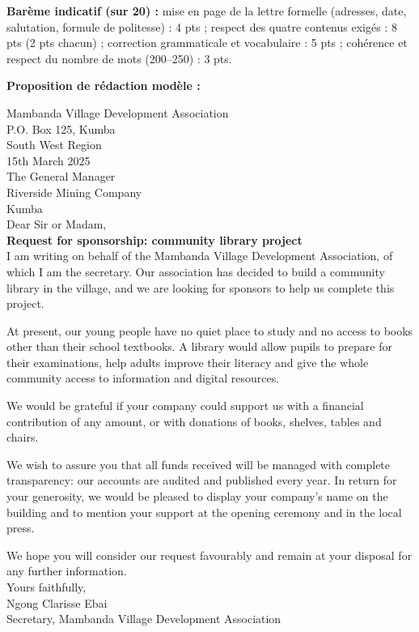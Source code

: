 \documentclass[11pt]{article}
\begin{document}
\begin{corrige}
\textbf{Barème indicatif (sur 20) :} mise en page de la lettre formelle (adresses, date, salutation, formule de politesse) : 4 pts ; respect des quatre contenus exigés : 8 pts (2 pts chacun) ; correction grammaticale et vocabulaire : 5 pts ; cohérence et respect du nombre de mots (200--250) : 3 pts.

\textbf{Proposition de rédaction modèle :}

\begin{textebox}
Mambanda Village Development Association\\
P.O. Box 125, Kumba\\
South West Region\\[0.3em]
15th March 2025\\[0.3em]
The General Manager\\
Riverside Mining Company\\
Kumba\\[0.3em]
Dear Sir or Madam,\\[0.3em]
\textbf{Request for sponsorship: community library project}\\[0.3em]
I am writing on behalf of the Mambanda Village Development Association, of which I am the secretary. Our association has decided to build a community library in the village, and we are looking for sponsors to help us complete this project.

At present, our young people have no quiet place to study and no access to books other than their school textbooks. A library would allow pupils to prepare for their examinations, help adults improve their literacy and give the whole community access to information and digital resources.

We would be grateful if your company could support us with a financial contribution of any amount, or with donations of books, shelves, tables and chairs.

We wish to assure you that all funds received will be managed with complete transparency: our accounts are audited and published every year. In return for your generosity, we would be pleased to display your company's name on the building and to mention your support at the opening ceremony and in the local press.

We hope you will consider our request favourably and remain at your disposal for any further information.\\[0.3em]
Yours faithfully,\\[0.3em]
Ngong Clarisse Ebai\\
Secretary, Mambanda Village Development Association
\end{textebox}


\end{corrige}
\end{document}
